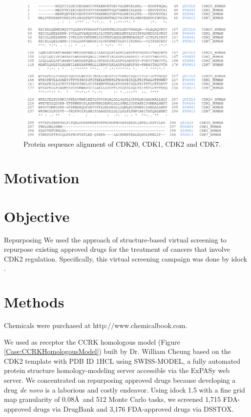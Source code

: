 \begin{figure}
\centering
\includegraphics[width=\linewidth]{../ccrk/CDKAlignment.png}
\caption{Protein sequence alignment of CDK20, CDK1, CDK2 and CDK7.}
\label{Case:CDKAlignment}
\end{figure}

\section{Motivation}



\section{Objective}

Repurposing
We used the approach of structure-based virtual screening to repurpose existing approved drugs for the treatment of cancers that involve CDK2 regulation. Specifically, this virtual screening campaign was done by idock \citep{1153}.

\section{Methods}

Chemicals were purchased at http://www.chemicalbook.com.

We used as receptor the CCRK homologous model (Figure \ref{Case:CCRKHomologousModel}) built by Dr. William Cheung based on the CDK2 template with PDB ID 1HCL \citep{1142} using SWISS-MODEL, a fully automated protein structure homology-modeling server accessible via the ExPASy web server. We concentrated on repurposing approved drugs \citep{944,1023} because developing a drug \textit{de novo} is a laborious and costly endeavor. Using idock 1.5 with a fine grid map granularity of 0.08\AA\ and 512 Monte Carlo tasks, we screened 1,715 FDA-approved drugs via DrugBank and 3,176 FDA-approved drugs via DSSTOX.

